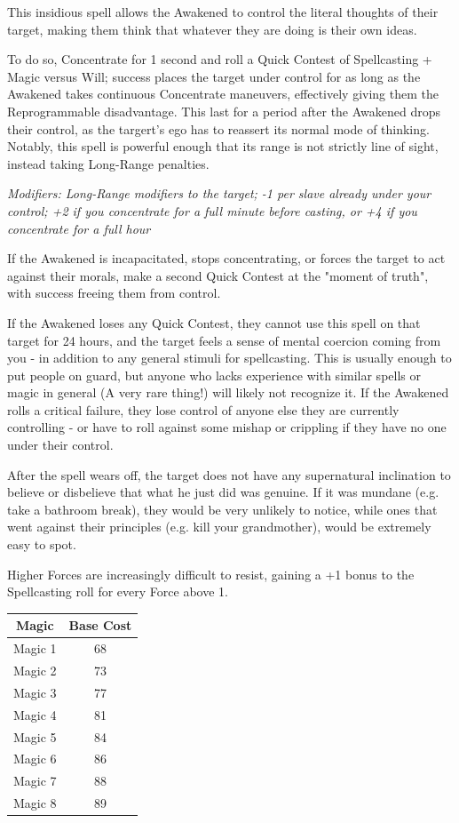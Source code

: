 \begin{multicols*}{3}
	This insidious spell allows the Awakened to control the literal thoughts of their target, making them think that whatever they are doing is their own ideas.
	
	To do so, Concentrate for 1 second and roll a Quick Contest of Spellcasting + Magic versus Will; success places the target under control for as long as the Awakened takes continuous Concentrate maneuvers, effectively giving them the Reprogrammable disadvantage. This last for a period after the Awakened drops their control, as the targert's ego has to reassert its normal mode of thinking. Notably, this spell is powerful enough that its range is not strictly line of sight, instead taking Long-Range penalties.
	
	\textcolor{NavyBlue}{\textit{Modifiers: Long-Range modifiers to the target; -1 per slave already under your control; +2 if you concentrate for a full minute before casting, or +4 if you concentrate for a full hour}}
	
	If the Awakened is incapacitated, stops concentrating, or forces the target to act against their morals, make a second Quick Contest at the "moment of truth", with success freeing them from control.
	
	If the Awakened loses any Quick Contest, they cannot use this spell on that target for 24 hours, and the target feels a sense of mental coercion coming from you - in addition to any general stimuli for spellcasting. This is usually enough to put people on guard, but anyone who lacks experience with similar spells or magic in general (A very rare thing!) will likely not recognize it. If the Awakened rolls a critical failure, they lose control of anyone else they are currently controlling - or have to roll against some mishap or crippling if they have no one under their control.
	
	After the spell wears off, the target does not have any supernatural inclination to believe or disbelieve that what he just did was genuine. If it was mundane (e.g. take a bathroom break), they would be very unlikely to notice, while ones that went against their principles (e.g. kill your grandmother), would be extremely easy to spot.
	
	Higher Forces are increasingly difficult to resist, gaining a +1 bonus to the Spellcasting roll for every Force above 1.
	
	\begin{center}
		\begin{tabular}{|c|c|}
			\hline
			Magic & Base Cost \\
			\hline
			\hline
			Magic 1 & 68 \\
			Magic 2 & 73 \\
			Magic 3 & 77 \\
			Magic 4 & 81 \\
			Magic 5 & 84 \\
			Magic 6 & 86 \\
			Magic 7 & 88 \\
			Magic 8 & 89 \\
			\hline
		\end{tabular}
	\end{center}	
	

\end{multicols*}
